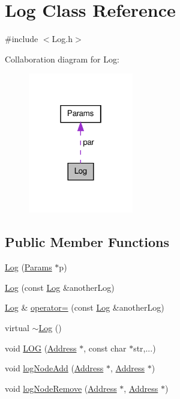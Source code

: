 \hypertarget{class_log}{\section{\-Log \-Class \-Reference}
\label{d6/d70/class_log}
}


{\ttfamily \#include $<$\-Log.\-h$>$}



\-Collaboration diagram for \-Log\-:
\nopagebreak
\begin{figure}[H]
\begin{center}
\leavevmode
\includegraphics[width=130pt]{d8/d07/class_log__coll__graph}
\end{center}
\end{figure}
\subsection*{\-Public \-Member \-Functions}
\begin{DoxyCompactItemize}
\item 
\hyperlink{class_log_aa688df18833d2692f2fe2bad29c6bb0b}{\-Log} (\hyperlink{class_params}{\-Params} $\ast$p)
\item 
\hyperlink{class_log_a916b0ff8710edcf0cb98748289e3db17}{\-Log} (const \hyperlink{class_log}{\-Log} \&another\-Log)
\item 
\hyperlink{class_log}{\-Log} \& \hyperlink{class_log_a6cdf3d55a6145e372e216f228c168638}{operator=} (const \hyperlink{class_log}{\-Log} \&another\-Log)
\item 
virtual \hyperlink{class_log_a0fbfda88fbee5027c89f6eb121059360}{$\sim$\-Log} ()
\item 
void \hyperlink{class_log_a92329c48f5a27043e24f1748bc7292e4}{\-L\-O\-G} (\hyperlink{class_address}{\-Address} $\ast$, const char $\ast$str,...)
\item 
void \hyperlink{class_log_a42c2ceae15f1b56cce04354b80a49ecb}{log\-Node\-Add} (\hyperlink{class_address}{\-Address} $\ast$, \hyperlink{class_address}{\-Address} $\ast$)
\item 
void \hyperlink{class_log_afc655d245c4b755488b8a8a371a1d6b9}{log\-Node\-Remove} (\hyperlink{class_address}{\-Address} $\ast$, \hyperlink{class_address}{\-Address} $\ast$)
\end{DoxyCompactItemize}
